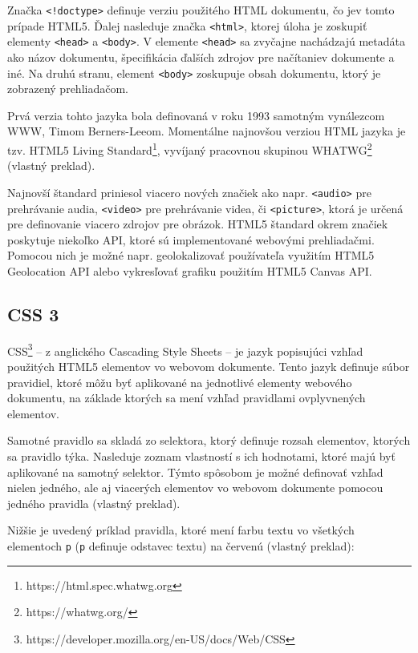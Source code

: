 Značka \texttt{<!doctype>} definuje verziu použitého HTML dokumentu, čo je\newline v tomto prípade HTML5. Ďalej nasleduje značka \texttt{<html>}, ktorej úloha je zoskupiť elementy \texttt{<head>} a \texttt{<body>}. V elemente \texttt{<head>} sa zvyčajne nachádzajú metadáta ako názov dokumentu, špecifikácia ďalších zdrojov pre načítanie\newline v dokumente a iné. Na druhú stranu, element \texttt{<body>} zoskupuje obsah dokumentu, ktorý je zobrazený prehliadačom.

Prvá verzia tohto jazyka bola definovaná v roku 1993 samotným vynálezcom WWW, Timom Berners-Leeom. Momentálne najnovšou verziou HTML jazyka je tzv. HTML5 Living Standard\footnote{https://html.spec.whatwg.org}, vyvíjaný pracovnou skupinou WHATWG\footnote{https://whatwg.org/} \cite{html_standard} (vlastný preklad).

Najnovší štandard priniesol viacero nových značiek ako napr. \texttt{<audio>} pre prehrávanie audia, \texttt{<video>} pre prehrávanie videa, či \texttt{<picture>}, ktorá je určená pre definovanie viacero zdrojov pre obrázok. HTML5 štandard okrem značiek poskytuje niekoľko API, ktoré sú implementované webovými prehliadačmi. Pomocou nich je možné napr. geolokalizovať používateľa využitím HTML5 Geolocation API alebo vykresľovať grafiku použitím HTML5 Canvas API.

\clearpage

\subsection {CSS 3}
CSS\footnote{https://developer.mozilla.org/en-US/docs/Web/CSS} -- z anglického Cascading Style Sheets -- je jazyk popisujúci vzhľad použitých HTML5 elementov vo webovom dokumente. Tento jazyk definuje súbor pravidiel, ktoré môžu byť aplikované na jednotlivé elementy webového dokumentu, na základe ktorých sa mení vzhľad pravidlami ovplyvnených elementov.

Samotné pravidlo sa skladá zo selektora, ktorý definuje rozsah elementov, ktorých sa pravidlo týka. Nasleduje zoznam vlastností s ich hodnotami, ktoré majú byť aplikované na samotný selektor. Týmto spôsobom je možné definovať vzhľad nielen jedného, ale aj viacerých elementov vo webovom dokumente pomocou jedného pravidla \cite{css_basics} (vlastný preklad).

Nižšie je uvedený príklad pravidla, ktoré mení farbu textu vo všetkých elementoch \texttt{p} (\texttt{p} definuje odstavec textu) na červenú \cite{css_basics} (vlastný preklad):

